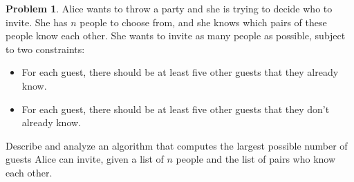 \documentclass{article}
\theoremstyle{definition}
\newtheorem{problem}{Problem}
\begin{document}
\newpage



\begin{problem}
    Alice wants to throw a party and she is trying to decide who to invite. She has $n$ people to choose from, and she knows which pairs of these people know each other. She wants to invite as many people as possible, subject to two constraints:

\begin{itemize}
    \item For each guest, there should be at least five other guests that they already know.
\item For each guest, there should be at least five other guests that they don't already know.

\end{itemize}
Describe and analyze an algorithm that computes the largest possible number of guests Alice can invite, given a list of $n$ people and the list of pairs who know each other.
\end{problem}
\end{document}
